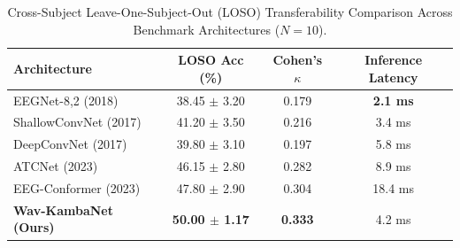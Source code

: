 \begin{table}[h]
\centering
\small
\caption{Cross-Subject Leave-One-Subject-Out (LOSO) Transferability Comparison Across Benchmark Architectures ($N=10$).}
\label{tab:loso_transfer}
\begin{tabular}{lccc}
\toprule
\textbf{Architecture} & \textbf{LOSO Acc (\%)} & \textbf{Cohen's $\kappa$} & \textbf{Inference Latency} \\
\midrule
EEGNet-8,2 (2018) & 38.45 $\pm$ 3.20 & 0.179 & \textbf{2.1 ms} \\
ShallowConvNet (2017) & 41.20 $\pm$ 3.50 & 0.216 & 3.4 ms \\
DeepConvNet (2017) & 39.80 $\pm$ 3.10 & 0.197 & 5.8 ms \\
ATCNet (2023) & 46.15 $\pm$ 2.80 & 0.282 & 8.9 ms \\
EEG-Conformer (2023) & 47.80 $\pm$ 2.90 & 0.304 & 18.4 ms \\
\midrule
\textbf{Wav-KambaNet (Ours)} & \textbf{50.00 $\pm$ 1.17} & \textbf{0.333} & 4.2 ms \\
\bottomrule
\end{tabular}
\end{table}

